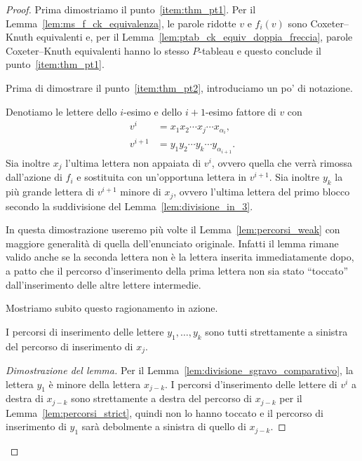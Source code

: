 \begin{proof}
    Prima dimostriamo il punto~\ref{item:thm_pt1}.
    Per il Lemma~\ref{lem:ms_f_ck_equivalenza}, le parole ridotte $v$ e $f_i(v)$ sono 
    Coxeter--Knuth equivalenti e, per il Lemma~\ref{lem:ptab_ck_equiv_doppia_freccia},
    parole Coxeter--Knuth equivalenti hanno lo stesso $P$-tableau e questo conclude
    il punto~\ref{item:thm_pt1}.

    Prima di dimostrare il punto~\ref{item:thm_pt2}, introduciamo un po' di notazione.

    Denotiamo le lettere dello $i$-esimo e dello $i+1$-esimo fattore di $v$ con
    \begin{align*}
        v^i &= x_1 x_2 \cdots x_j \cdots x_{\alpha_i}, \\
        v^{i+1} &= y_1 y_2 \cdots y_k \cdots y_{\alpha_{i+1}}.
    \end{align*}
    Sia inoltre $x_j$ l'ultima lettera non appaiata di $v^i$, ovvero quella 
    che verr\`a rimossa dall'azione di $f_i$ e sostituita con un'opportuna lettera
    in $v^{i+1}$.
    Sia inoltre $y_k$ la pi\`u grande lettera di $v^{i+1}$ minore di $x_j$,
    ovvero l'ultima lettera del primo blocco secondo la suddivisione del 
    Lemma~\ref{lem:divisione_in_3}.


    In questa dimostrazione useremo pi\`u volte il Lemma~\ref{lem:percorsi_weak}
    con maggiore generalit\`a di quella dell'enunciato originale.
    Infatti il lemma rimane valido anche se la seconda lettera non \`e la lettera
    inserita immediatamente dopo, a patto che il percorso d'inserimento della prima
    lettera non sia stato ``toccato'' dall'inserimento delle altre lettere intermedie.

    Mostriamo subito questo ragionamento in azione.

    \begin{lemma}
        \label{lem:thm_trascuro_inizio}
        I percorsi di inserimento delle lettere $y_1, \dots, y_k$ sono tutti strettamente
        a sinistra del percorso di inserimento di $x_j$.
    \end{lemma}

    \begin{proof}[Dimostrazione del lemma]
        Per il Lemma~\ref{lem:divisione_sgravo_comparativo}, la lettera $y_1$
        \`e minore della lettera $x_{j-k}$.
        I percorsi d'inserimento delle lettere di $v^i$ a destra di $x_{j-k}$ sono strettamente
        a destra del percorso di $x_{j-k}$ per il Lemma~\ref{lem:percorsi_strict},
        quindi non lo hanno toccato e il percorso di inserimento di $y_1$ sar\`a
        debolmente a sinistra di quello di $x_{j-k}$.


\end{proof}
\end{proof}
